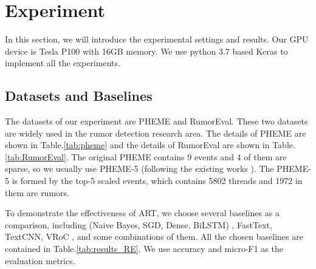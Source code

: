 \section{Experiment}
\label{sec:experiment}
In this section, we will introduce the experimental settings and results. Our GPU device is Tesla P100 with 16GB memory. We use python 3.7 based Keras to implement all the experiments.

\subsection{Datasets and Baselines}
\label{sec:dataset}
The datasets of our experiment are  PHEME \cite{DBLP:conf/coling/KochkinaLZ18} and RumorEval\cite{DBLP:conf/semeval/EnayetE17}. These two datasets are widely used in the rumor detection research area. The details of PHEME are shown in Table.\ref{tab:pheme} and the details of RumorEval are shown in Table.\ref{tab:RumorEval}. The original PHEME contains 9 events and 4 of them are sparse, so we usually use PHEME-5 (following the existing works \cite{DBLP:conf/www/ChengNB20}). The PHEME-5 is formed by the top-5 scaled events, which contains 5802 threads and 1972 in them are rumors. 

To demonstrate the effectiveness of ART, we choose several baselines as a comparison, including (Naive Bayes, SGD, Dense, BiLSTM) \cite{DBLP:conf/emnlp/QazvinianRRM11}, FastText\cite{DBLP:conf/eacl/GraveMJB17}, TextCNN\cite{DBLP:conf/emnlp/Kim14}, VRoC \cite{DBLP:conf/www/ChengNB20}, and some combinations of them. All the chosen baselines are contained in Table.\ref{tab:results_RE}. We use accuracy and micro-F1 as the evaluation metrics.

\begin{table}[htbp]
	\caption{PHEME}
	\centering
	\label{tab:pheme}
\end{table}

